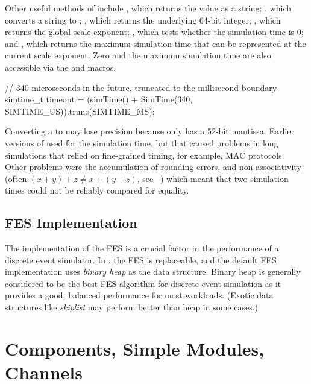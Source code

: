 Other useful methods of  include ,
which returns the value as a string; , which converts a
string to ; , which returns the
underlying 64-bit integer; , which returns the
global scale exponent; , which tests whether the
simulation time is 0; and , which returns the maximum
simulation time that can be represented at the current scale exponent.
Zero and the maximum simulation time are also accessible
via the  and  macros.

\begin{cpp}
// 340 microseconds in the future, truncated to the millisecond boundary
simtime_t timeout = (simTime() + SimTime(340, SIMTIME_US)).trunc(SIMTIME_MS);
\end{cpp}

\begin{note}
   Converting a  to  may lose precision because
    only has a 52-bit mantissa.
   Earlier versions of {\opp} used  for the simulation
   time, but that caused problems in long simulations that relied on fine-grained timing,
   for example, MAC protocols. Other problems were the accumulation of
   rounding errors, and non-associativity (often $(x+y)+z \neq x+(y+z)$, see
   ~\cite{Goldberg91what}) which meant that two  simulation
   times could not be reliably compared for equality.
\end{note}


\subsection{FES Implementation}
\label{sec:simple-modules:fes-implementation}

The implementation of the FES is a crucial factor in the
performance of a discrete event simulator. In {\opp}, the FES is
replaceable, and the default FES implementation uses \textit{binary
heap} as the data structure. Binary heap is generally
considered to be the best FES algorithm for discrete event simulation as
it provides a good, balanced performance for most workloads. (Exotic data
structures like \textit{skiplist} may perform better than
heap in some cases.)


\section{Components, Simple Modules, Channels}
\label{sec:simple-modules:simple-modules-in-opp}


